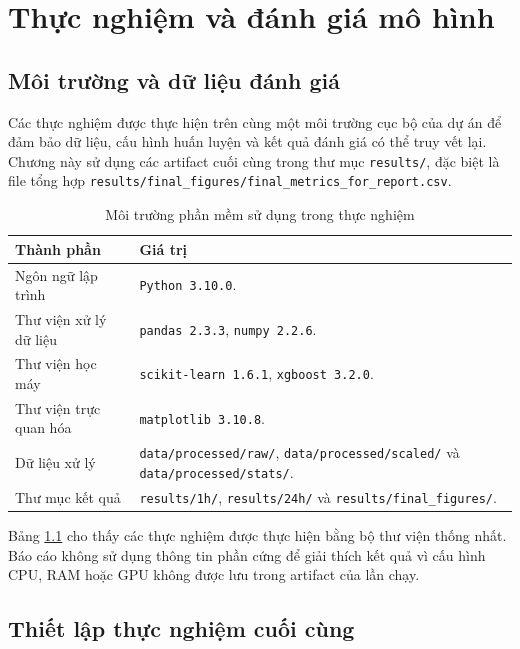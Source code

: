 \chapter{Thực nghiệm và đánh giá mô hình}

\section{Môi trường và dữ liệu đánh giá}

Các thực nghiệm được thực hiện trên cùng một môi trường cục bộ của dự án để đảm bảo dữ liệu, cấu hình huấn luyện và kết quả đánh giá có thể truy vết lại. Chương này sử dụng các artifact cuối cùng trong thư mục \texttt{results/}, đặc biệt là file tổng hợp \texttt{results/final\_figures/final\_metrics\_for\_report.csv}.

\begin{table}[H]
  \centering
  \caption{Môi trường phần mềm sử dụng trong thực nghiệm}
  \begin{tabular}{p{4.2cm} p{8.8cm}}
    \toprule
    \textbf{Thành phần} & \textbf{Giá trị} \\
    \midrule
    Ngôn ngữ lập trình & \texttt{Python 3.10.0}. \\
    Thư viện xử lý dữ liệu & \texttt{pandas 2.3.3}, \texttt{numpy 2.2.6}. \\
    Thư viện học máy & \texttt{scikit-learn 1.6.1}, \texttt{xgboost 3.2.0}. \\
    Thư viện trực quan hóa & \texttt{matplotlib 3.10.8}. \\
    Dữ liệu xử lý & \texttt{data/processed/raw/}, \texttt{data/processed/scaled/} và \texttt{data/processed/stats/}. \\
    Thư mục kết quả & \texttt{results/1h/}, \texttt{results/24h/} và \texttt{results/final\_figures/}. \\
    \bottomrule
  \end{tabular}
  \label{tab:experiment_environment}
\end{table}

Bảng \ref{tab:experiment_environment} cho thấy các thực nghiệm được thực hiện bằng bộ thư viện thống nhất. Báo cáo không sử dụng thông tin phần cứng để giải thích kết quả vì cấu hình CPU, RAM hoặc GPU không được lưu trong artifact của lần chạy.

\section{Thiết lập thực nghiệm cuối cùng}

